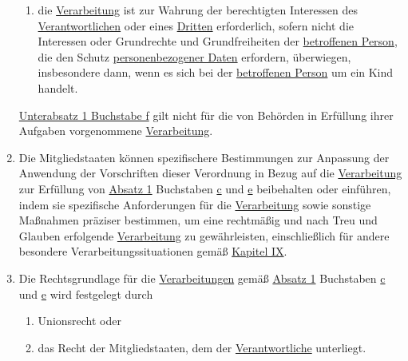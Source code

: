 \begin{enumerate}
\begin{enumerate}
    \item die \hyperref[itm:04-2]{Verarbeitung} ist zur Wahrung der berechtigten Interessen  des \hyperref[itm:04-7]{Verantwortlichen} oder eines \hyperref[itm:04-10]
     {Dritten} erforderlich, sofern nicht die Interessen oder Grundrechte und Grundfreiheiten der \hyperref[itm:04-1]
     {betroffenen Person}, die den Schutz \hyperref[itm:04-1]{personenbezogener Daten} erfordern, überwiegen,
     insbesondere dann, wenn es sich bei der \hyperref[itm:04-1]{betroffenen Person} um ein Kind handelt.%
    \label{itm:06-1f}

  \end{enumerate}

  \hyperref[itm:06-1f]{Unterabsatz 1 Buchstabe f} gilt nicht für die von Behörden in Erfüllung ihrer Aufgaben
  vorgenommene \hyperref[itm:04-2]{Verarbeitung}.

  \item Die Mitgliedstaaten können spezifischere Bestimmungen zur Anpassung der Anwendung der Vorschriften dieser
   Verordnung in Bezug auf die \hyperref[itm:04-2]{Verarbeitung} zur Erfüllung von \hyperref[itm:06-1]{Absatz 1}
   Buchstaben \hyperref[itm:06-1c]{c} und \hyperref[itm:06-1e]{e} beibehalten oder einführen, indem sie spezifische
   Anforderungen für die \hyperref[itm:04-2]{Verarbeitung} sowie sonstige Maßnahmen präziser bestimmen, um eine
   rechtmäßig und nach Treu und Glauben erfolgende \hyperref[itm:04-2]{Verarbeitung} zu gewährleisten, einschließlich
   für andere besondere Verarbeitungssituationen gemäß \hyperref[part:9]{Kapitel IX}.%
  \label{itm:06-2}

  \item Die Rechtsgrundlage für die \hyperref[itm:04-2]{Verarbeitungen} gemäß \hyperref[itm:06-1]{Absatz 1}
   Buchstaben \hyperref[itm:06-1c]{c} und \hyperref[itm:06-1e]{e} wird festgelegt durch%
  \label{itm:06-3}

  \begin{enumerate}
  
    \item Unionsrecht oder%
    \label{itm:06-3a}

    \item das Recht der Mitgliedstaaten, dem der \hyperref[itm:04-7]{Verantwortliche} unterliegt.%
    \label{itm:06-3b}


\end{enumerate}
\end{enumerate}
